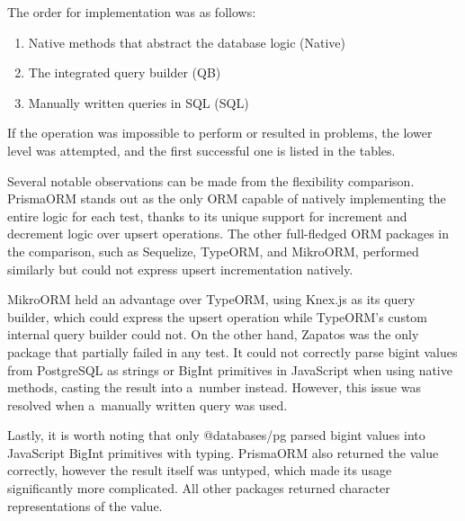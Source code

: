 The order for implementation was as follows:
\begin{enumerate}
  \item Native methods that abstract the database logic (Native)
  \item The integrated query builder (QB)
  \item Manually written queries in SQL (SQL)
\end{enumerate}
If the operation was impossible to perform or resulted in problems, the lower
level was attempted, and the first successful one is listed in the tables.

Several notable observations can be made from the flexibility comparison.
PrismaORM stands out as the only ORM capable of natively implementing the entire
logic for each test, thanks to its unique support for increment and decrement
logic over upsert operations. The other full-fledged ORM packages in the
comparison, such as Sequelize, TypeORM, and MikroORM, performed similarly but
could not express upsert incrementation natively.

MikroORM held an advantage over TypeORM, using Knex.js as its query builder,
which could express the upsert operation while TypeORM's custom internal query
builder could not. On the other hand, Zapatos was the only package that
partially failed in any test. It could not correctly parse bigint values from
PostgreSQL as strings or BigInt primitives in JavaScript when using native
methods, casting the result into a~number instead. However, this issue was
resolved when a~manually written query was used.

Lastly, it is worth noting that only @databases/pg parsed bigint values into
JavaScript BigInt primitives with typing. PrismaORM also returned the value
correctly, however the result itself was untyped, which made its usage
significantly more complicated. All other packages returned character
representations of the value. 


